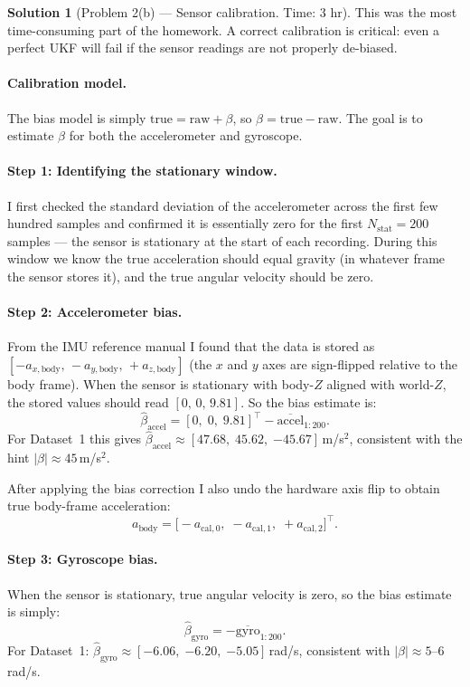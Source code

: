\documentclass[11pt, reqno, letterpaper]{amsart}
\theoremstyle{plain}
\theoremstyle{definition}
\newtheorem{solution}[theorem]{Solution}
\begin{document}
\medskip
\begin{solution}[Problem 2(b) — Sensor calibration. Time: 3 hr]

This was the most time-consuming part of the homework.
A correct calibration is critical: even a perfect UKF will fail if the
sensor readings are not properly de-biased.

\paragraph{Calibration model.}
The bias model is simply $\text{true} = \text{raw} + \beta$,
so $\beta = \text{true} - \text{raw}$.
The goal is to estimate $\beta$ for both the accelerometer and gyroscope.

\paragraph{Step 1: Identifying the stationary window.}
I first checked the standard deviation of the accelerometer across the first
few hundred samples and confirmed it is essentially zero for the first
$N_\text{stat}=200$ samples — the sensor is stationary at the start
of each recording.
During this window we know the true acceleration should equal gravity
(in whatever frame the sensor stores it), and the true angular velocity
should be zero.

\paragraph{Step 2: Accelerometer bias.}
From the IMU reference manual I found that the data is stored as
$[-a_{x,\text{body}},\,-a_{y,\text{body}},\,+a_{z,\text{body}}]$
(the $x$ and $y$ axes are sign-flipped relative to the body frame).
When the sensor is stationary with body-$Z$ aligned with world-$Z$,
the stored values should read $[0,\,0,\,9.81]$.
So the bias estimate is:
\[
  \hat\beta_\text{accel} = [0,\;0,\;9.81]^\top - \overline{\text{accel}}_{1:200}.
\]
For Dataset~1 this gives
$\hat\beta_\text{accel}\approx[47.68,\;45.62,\;{-45.67}]$\,m/s$^2$,
consistent with the hint $|\beta|\approx45$\,m/s$^2$.

After applying the bias correction I also undo the hardware axis flip to
obtain true body-frame acceleration:
\[
  a_\text{body} = \bigl[-a_{\text{cal},0},\;-a_{\text{cal},1},\;+a_{\text{cal},2}\bigr]^\top.
\]

\paragraph{Step 3: Gyroscope bias.}
When the sensor is stationary, true angular velocity is zero,
so the bias estimate is simply:
\[
  \hat\beta_\text{gyro} = -\overline{\text{gyro}}_{1:200}.
\]
For Dataset~1: $\hat\beta_\text{gyro}\approx[-6.06,\;{-6.20},\;{-5.05}]$\,rad/s,
consistent with $|\beta|\approx5$--6\,rad/s.


\end{solution}
\end{document}
